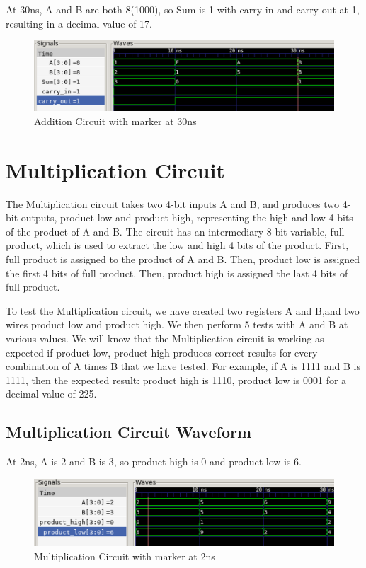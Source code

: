 \documentclass[12pt]{article}
\begin{document}
 At 30ns, A and B are both 8(1000), so Sum is 1 with carry in and carry out at 1, resulting in a decimal value of 17.
 \begin{figure}[H]
 \centering 
\includegraphics[width = 1.0\textwidth]{Addition/addition_wave2.png}
 \caption{Addition Circuit with marker at 30ns}
 \label{fig:enter-label}
 \end{figure}

\section{Multiplication Circuit}
The Multiplication circuit takes two 4-bit inputs A and B, and produces two 4-bit outputs, product low and product high, representing the high and low 4 bits of the product of A and B. The circuit has an intermediary 8-bit variable, full product, which is used to extract the low and high 4 bits of the product. First, full product is assigned to the product of A and B. Then, product low is assigned the first 4 bits of full product. Then, product high is assigned the last 4 bits of full product. 
 

To test the Multiplication circuit, we have created two registers A and B,and two wires product low and product high. We then perform 5 tests with A and B at various values. We will know that the Multiplication circuit is working as expected if product low, product high produces correct results for every combination of A times B that we have tested. For example, if A is 1111 and B is 1111, then the expected result: product high is 1110, product low is 0001 for a decimal value of 225.

\subsection{Multiplication Circuit Waveform} 

At 2ns, A is 2 and B is 3, so product high is 0 and product low is 6.  
\begin{figure}[H]
 \centering
 \includegraphics[width = 1.0\textwidth]{Multiplication/multiplication_wave.png}
 \caption{Multiplication Circuit with marker at 2ns}
 \label{fig:enter-label} 
\end{figure} 
\end{document}
